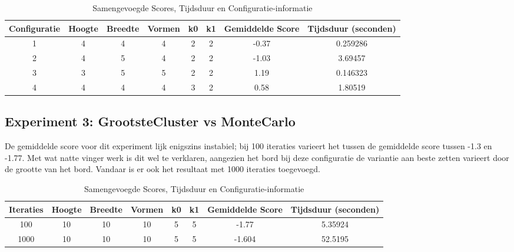 \documentclass[10pt]{article}
\begin{document}
\begin{table}[h]
    \centering
    \caption{Samengevoegde Scores, Tijdsduur en Configuratie-informatie}
    \begin{tabular}{@{}cccccccc@{}}
        \toprule
        Configuratie & Hoogte & Breedte & Vormen & k0 & k1 & Gemiddelde Score & Tijdsduur (seconden) \\ 
        \midrule
        1 & 4 & 4 & 4 & 2 & 2 & -0.37 & 0.259286 \\
        2 & 4 & 5 & 4 & 2 & 2 & -1.03 & 3.69457 \\
        3 & 3 & 5 & 5 & 2 & 2 & 1.19 & 0.146323 \\
        4 & 4 & 4 & 4 & 3 & 2 & 0.58 & 1.80519 \\
        \bottomrule
    \end{tabular}
\end{table}
\FloatBarrier

\subsection{Experiment 3: GrootsteCluster vs MonteCarlo }
De gemiddelde score voor dit experiment lijk enigszins instabiel; bij 100 iteraties varieert het tussen de gemiddelde score tussen -1.3 en -1.77.
Met wat natte vinger werk is dit wel te verklaren, aangezien het bord bij deze configuratie de variantie aan beste zetten varieert door de grootte van het bord.
Vandaar is er ook het resultaat met 1000 iteraties toegevoegd.

\begin{table}[h]
    \centering
    \caption{Samengevoegde Scores, Tijdsduur en Configuratie-informatie}
    \begin{tabular}{@{}cccccccc@{}}
        \toprule
        Iteraties & Hoogte & Breedte & Vormen & k0 & k1 & Gemiddelde Score & Tijdsduur (seconden) \\ 
        \midrule
        100 & 10 & 10 & 10 & 5 & 5 & -1.77 & 5.35924 \\
        1000 & 10 & 10 & 10 & 5 & 5    & -1.604 & 52.5195 \\
        \bottomrule
    \end{tabular}
\end{table}
\FloatBarrier 
\end{document}
